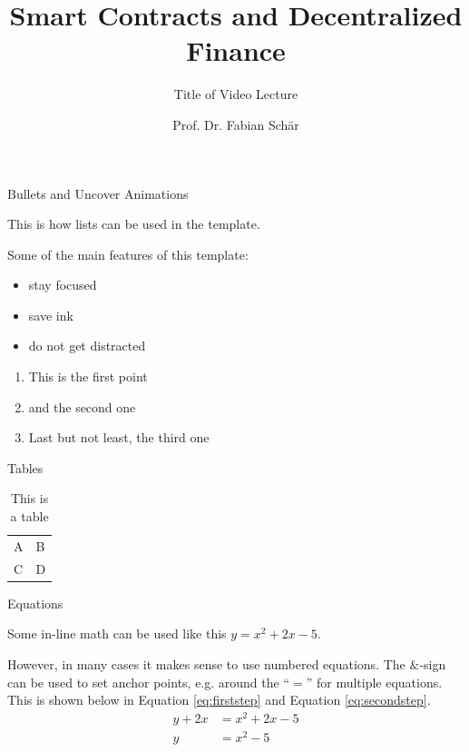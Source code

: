 \documentclass[]{beamer}
\title{Smart Contracts and Decentralized Finance}
\subtitle{Title of Video Lecture}
\author{Prof. Dr. Fabian Schär}
\institute{University of Basel}
\begin{document}
\thispagestyle{empty}
\begin{frame}[noframenumbering]
	\titlepage
\end{frame}

\begin{frame}{Bullets and Uncover Animations}

This is how lists can be used in the template. \\ \vspace{1em}

Some of the main features of this template:
	
	\begin{itemize}
		\item<1-> stay focused
		\item<2-> save ink
		\item<3-> do not get distracted
	\end{itemize}

	\vspace{1em}	

	\begin{enumerate}
		\item<5-> This is the first point
		\item<6-> and the second one
		\item<7-> Last but not least, the third one
	\end{enumerate}
	
\end{frame}

\begin{frame}{Tables}
	\begin{table}
		\begin{tabular}{ll}
			A & B\\
			C & D
		\end{tabular}
		\caption{This is a table}
		\label{tbl:simpletable}
	\end{table}
\end{frame}

\begin{frame}{Equations}

Some in-line math can be used like this $y=x^2+2x-5$. \\ \vspace{1em}

However, in many cases it makes sense to use numbered equations. The $\&$-sign can be used to set anchor points, e.g. around the ``$=$'' for multiple equations. This is shown below in Equation \eqref{eq:firststep} and Equation \eqref{eq:secondstep}.
	\begin{align}
		y + 2x &= x^2+2x-5 \label{eq:firststep}\\
		y &= x^2-5 \label{eq:secondstep}
	\end{align}
\end{frame}
\end{document}
